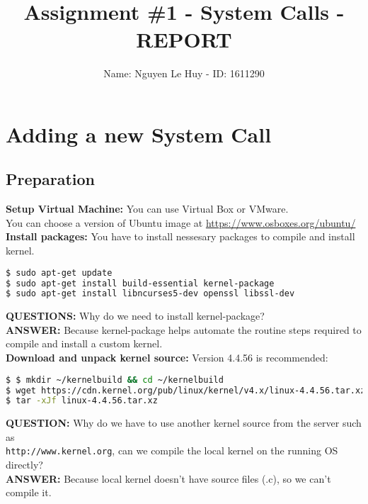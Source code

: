 \documentclass[12pt]{article}
\begin{document}
    \title{\textbf{Assignment \#1 - System Calls - REPORT}}
    \author{Name: Nguyen Le Huy - ID: 1611290}
    \maketitle
    \section{Adding a new System Call}
        \subsection{Preparation}
            \textbf{Setup Virtual Machine:} You can use Virtual Box or VMware.\\
            You can choose a version of Ubuntu image at \url{https://www.osboxes.org/ubuntu/}\\
            \textbf{Install packages:} You have to install nessesary packages to compile and install kernel.
            \begin{lstlisting}[language=bash]
$ sudo apt-get update
$ sudo apt-get install build-essential kernel-package 
$ sudo apt-get install libncurses5-dev openssl libssl-dev\end{lstlisting}
            \textbf{QUESTIONS:} Why do we need to install kernel-package?\\
            \textbf{ANSWER:} Because kernel-package helps automate the routine steps required 
            to compile and install a custom kernel.\\
            \textbf{Download and unpack kernel source:} Version 4.4.56 is recommended:
            \begin{lstlisting}[language=bash]
$ $ mkdir ~/kernelbuild && cd ~/kernelbuild
$ wget https://cdn.kernel.org/pub/linux/kernel/v4.x/linux-4.4.56.tar.xz
$ tar -xJf linux-4.4.56.tar.xz\end{lstlisting}
            \textbf{QUESTION:} Why do we have to use another kernel source from the 
            server such as\\ \texttt{http://www.kernel.org}, 
            can we compile the local kernel on the running OS directly?\\
            \textbf{ANSWER:} Because local kernel doesn't have source files (.c), so we can't compile it.
\end{document}
